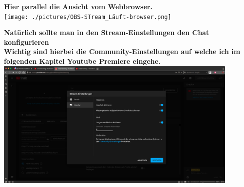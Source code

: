 \begin{center}
  \textbf{Hier parallel die Ansicht vom Webbrowser. } \\
  {\vspace{0.3cm}}
  \texttt{[image: ./pictures/OBS-STream\_Läuft-browser.png]}
\end{center}



\newpage
\begin{center}
  \textbf{Natürlich sollte man in den Stream-Einstellungen den Chat konfigurieren} \\
  \textbf{Wichtig sind hierbei die Community-Einstellungen auf welche ich im folgenden Kapitel Youtube Premiere eingehe.} \\
  {\vspace{0.3cm}}
  \includegraphics[width=0.9\textwidth]{./pictures/StreamOptionenLivechat.png}
\end{center}
